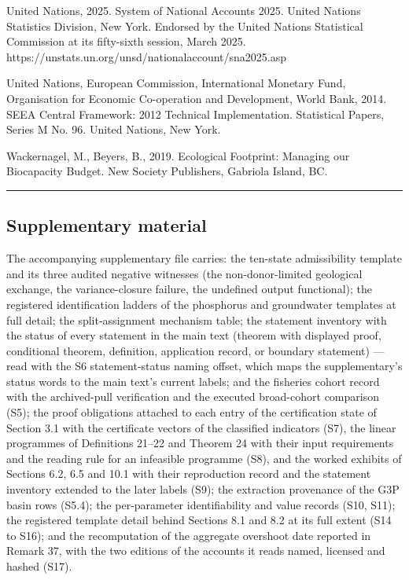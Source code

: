 \documentclass[11pt]{article}
\begin{document}
United Nations, 2025. System of National Accounts 2025. United Nations Statistics Division, New York. Endorsed by the United Nations Statistical Commission at its fifty-sixth session, March 2025. https://unstats.un.org/unsd/nationalaccount/sna2025.asp

United Nations, European Commission, International Monetary Fund, Organisation for Economic Co-operation and Development, World Bank, 2014. SEEA Central Framework: 2012 Technical Implementation. Statistical Papers, Series M No. 96. United Nations, New York.

Wackernagel, M., Beyers, B., 2019. Ecological Footprint: Managing our
Biocapacity Budget. New Society Publishers, Gabriola Island, BC.

\begin{center}\rule{0.5\linewidth}{0.5pt}\end{center}

\subsection{Supplementary material}\label{supplementary-material}

The accompanying supplementary file carries: the
ten-state admissibility template and its three audited negative
witnesses (the non-donor-limited geological exchange, the
variance-closure failure, the undefined output functional); the
registered identification ladders of the phosphorus and groundwater
templates at full detail; the split-assignment mechanism table; the
statement inventory with the status of every statement in the main text
(theorem with displayed proof, conditional theorem, definition,
application record, or boundary statement) --- read with the S6
statement-status naming offset, which maps the supplementary's status
words to the main text's current labels; and the fisheries cohort record
with the archived-pull verification and the executed broad-cohort
comparison (S5); the proof obligations attached to each entry of the certification state of Section 3.1 with the certificate vectors of the classified indicators (S7), the linear programmes of Definitions 21--22 and Theorem 24 with their input requirements and the reading rule for an infeasible programme (S8), and the worked exhibits of Sections 6.2, 6.5 and 10.1 with their reproduction record and the statement
inventory extended to the later labels (S9); the extraction provenance of the G3P basin rows (S5.4); the
per-parameter identifiability and value records (S10, S11); the registered template detail behind Sections
8.1 and 8.2 at its full extent (S14 to S16); and the recomputation of the aggregate overshoot date reported
in Remark 37, with the two editions of the accounts it reads named, licensed and hashed (S17).
\end{document}
